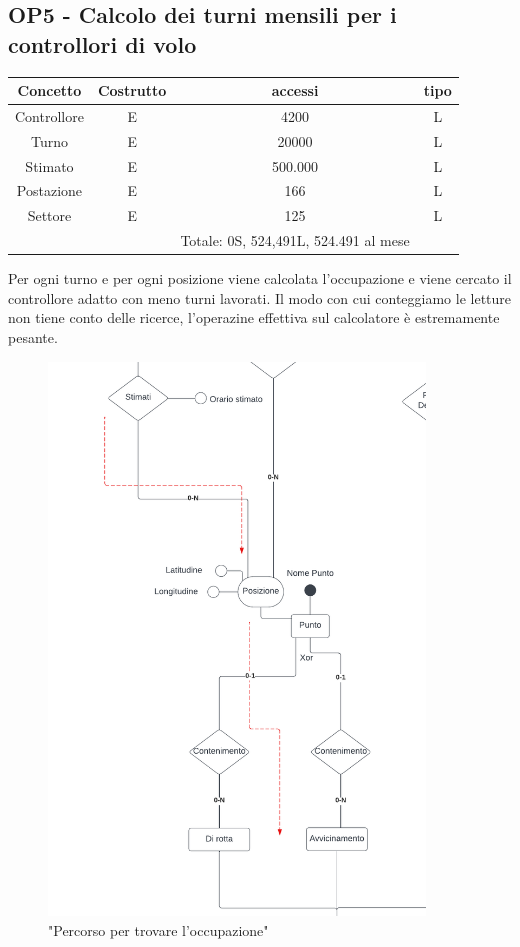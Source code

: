     \subsection*{OP5 - Calcolo dei turni mensili per i controllori di volo}
    \begin{table}[H]
    \centering
    \begin{tabular}{|c|c|c|c|}
    \hline
    \rowcolor{green!70!black!80}
    \textbf{Concetto} & \textbf{Costrutto} & \textbf{accessi} & \textbf{tipo}\\
    \hline
    Controllore & E & 4200 & L \\
    Turno & E & 20000 & L \\
    Stimato & E & 500.000 & L \\
    Postazione & E & 166 & L \\
    Settore & E & 125 & L \\
    & & Totale: 0S, 524,491L, 524.491 al mese &\\
    \hline
    \end{tabular}
    \end{table}
    Per ogni turno e per ogni posizione viene calcolata l'occupazione e viene cercato il controllore adatto con meno turni lavorati.
    Il modo con cui conteggiamo le letture non tiene conto delle ricerce, l'operazine effettiva sul calcolatore è estremamente pesante.
    \begin{figure}[H]
      \centering
      \includegraphics[width=10cm]{figures/BasicControllerarrowsp1.pdf}
      \caption{"Percorso per trovare l'occupazione"}
    \end{figure}
